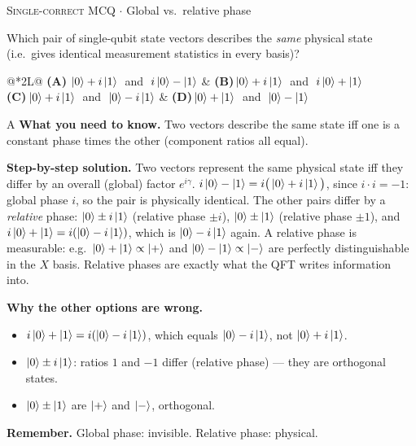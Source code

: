 \documentclass[11pt,a4paper]{article}
\newcommand{\optlabel}[1]{\textbf{(#1)}}
\newcommand{\correctlabel}[1]{\textcolor{okgreen}{\textbf{(#1)}\,\ding{51}}}
\newenvironment{qitem}[1]{\begin{list}{}{\setlength{\leftmargin}{3.3em}\setlength{\labelwidth}{3.1em}%
  \setlength{\labelsep}{0.2em}\setlength{\topsep}{3pt}\setlength{\parsep}{3pt}}\item[\textbf{Q.#1}\hfill]}{\end{list}}
\newcommand{\qsep}{\par\vspace{2pt}{\color{black!15}\hrule}\vspace{4pt}}
\newcommand{\qmeta}[2]{{\footnotesize\color{black!60}\textsc{#1} \;$\cdot$\; #2}\par}
\begin{document}
\begin{qitem}{22}
\qmeta{Single-correct MCQ}{Global vs.\ relative phase}
Which pair of single-qubit state vectors describes the \emph{same} physical state (i.e.\ gives identical
measurement statistics in every basis)?
\par\smallskip\noindent\begin{tabularx}{\linewidth}{@{}*{2}{L}@{}}
\correctlabel{A}\,$\ket{0} + i\ket{1}\;$ and $\;i\ket{0} - \ket{1}$ & \optlabel{B}\,$\ket{0} + i\ket{1}\;$ and $\;i\ket{0} + \ket{1}$ \\[3pt]
\optlabel{C}\,$\ket{0} + i\ket{1}\;$ and $\;\ket{0} - i\ket{1}$ & \optlabel{D}\,$\ket{0} + \ket{1}\;$ and $\;\ket{0} - \ket{1}$
\end{tabularx}
\end{qitem}
\begin{solbox}{A}
\textbf{\color{brand}What you need to know.} Two vectors describe the same state iff one is a constant phase times the other (component ratios all equal).

\textbf{\color{brand}Step-by-step solution.} Two vectors represent the same physical state iff they differ by an overall (global) factor $e^{i\gamma}$.
$i\ket{0} - \ket{1} = i\big(\ket{0} + i\ket{1}\big)$, since $i\cdot i = -1$: global phase $i$, so the pair is physically identical.
The other pairs differ by a \emph{relative} phase: $\ket{0} \pm i\ket{1}$ (relative phase $\pm i$), $\ket{0} \pm \ket{1}$
(relative phase $\pm1$), and $i\ket{0} + \ket{1} = i(\ket{0} - i\ket{1})$, which is $\ket{0} - i\ket{1}$ again.
A relative phase is measurable: e.g.\ $\ket{0}+\ket{1} \propto \ket{+}$ and $\ket{0} - \ket{1} \propto \ket{-}$ are perfectly
distinguishable in the $X$ basis. Relative phases are exactly what the QFT writes information into.

\textbf{\color{brand}Why the other options are wrong.}
\begin{itemize}[leftmargin=2.4em, itemsep=1pt, topsep=2pt]
\item[\textbf{(B)}] $i\ket0 + \ket1 = i(\ket0 - i\ket1)$, which equals $\ket0 - i\ket1$, not $\ket0 + i\ket1$.
\item[\textbf{(C)}] $\ket0 \pm i\ket1$: ratios $1$ and $-1$ differ (relative phase) --- they are orthogonal states.
\item[\textbf{(D)}] $\ket0 \pm \ket1$ are $\ket{+}$ and $\ket{-}$, orthogonal.
\end{itemize}
\textbf{\color{brand}Remember.} Global phase: invisible. Relative phase: physical.
\end{solbox}
\qsep
\end{document}
